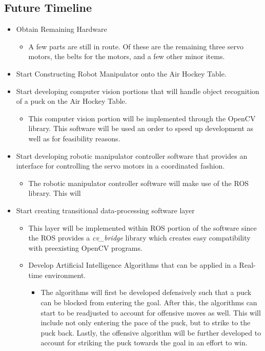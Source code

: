 \documentclass[letterpaper, 10 pt, conference]{ieeeconf}
\begin{document}
\subsection{Future Timeline}
\begin{itemize}
\item Obtain Remaining Hardware 
\begin{itemize}
\item A few parts are still in route.  Of these are the remaining three servo motors, the belts for the motors, and a few other minor items.
\end{itemize}
\item Start Constructing Robot Manipulator onto the Air Hockey Table.
\item Start developing computer vision portions that will handle object recognition of a puck on the Air Hockey Table.
\begin{itemize}
\item This computer vision portion will be implemented through the OpenCV \cite{opencv} library.  This software will be used an order to speed up development as well as for feasibility reasons.
\end{itemize}
\item Start developing robotic manipulator controller software that provides an interface for controlling the servo motors in a coordinated fashion.
\begin{itemize}
\item The robotic manipulator controller software will make use of the ROS \cite{ros} library.  This will
\end{itemize}
\item Start creating transitional data-processing software layer
\begin{itemize}
\item This layer will be implemented within ROS portion of the software since the ROS provides a \textit{cv\_bridge} library which creates easy compatibility with preexisting OpenCV programs.
\item Develop Artificial Intelligence Algorithms that can be applied in a Real-time environment.
\begin{itemize}
\item The algorithms will first be developed defensively such that a puck can be blocked from entering the goal.  After this, the algorithms can start to be readjusted to account for offensive moves as well.  This will include not only entering the pace of the puck, but to strike to the puck back.  Lastly, the offensive algorithm will be further developed to account for striking the puck towards the goal in an effort to win.

\end{itemize}
\end{itemize}
\end{itemize}
\end{document}
